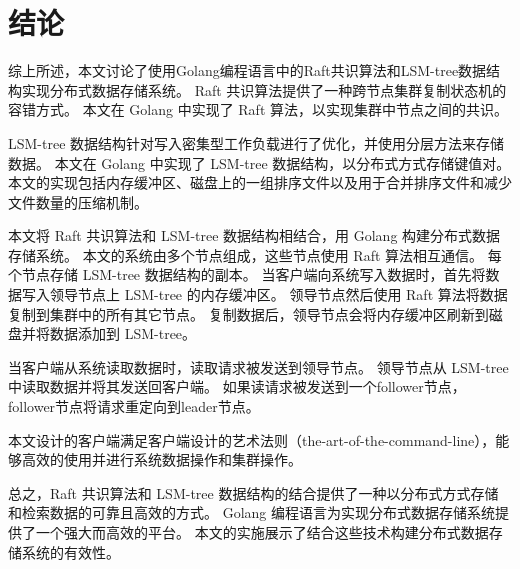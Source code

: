 \section*{结论}

综上所述，本文讨论了使用Golang编程语言中的Raft共识算法和LSM-tree数据结构实现分布式数据存储系统。 Raft 共识算法提供了一种跨节点集群复制状态机的容错方式。 本文在 Golang 中实现了 Raft 算法，以实现集群中节点之间的共识。

	LSM-tree 数据结构针对写入密集型工作负载进行了优化，并使用分层方法来存储数据。 本文在 Golang 中实现了 LSM-tree 数据结构，以分布式方式存储键值对。 本文的实现包括内存缓冲区、磁盘上的一组排序文件以及用于合并排序文件和减少文件数量的压缩机制。
	
	本文将 Raft 共识算法和 LSM-tree 数据结构相结合，用 Golang 构建分布式数据存储系统。 本文的系统由多个节点组成，这些节点使用 Raft 算法相互通信。 每个节点存储 LSM-tree 数据结构的副本。 当客户端向系统写入数据时，首先将数据写入领导节点上 LSM-tree 的内存缓冲区。 领导节点然后使用 Raft 算法将数据复制到集群中的所有其它节点。 复制数据后，领导节点会将内存缓冲区刷新到磁盘并将数据添加到 LSM-tree。
	
	当客户端从系统读取数据时，读取请求被发送到领导节点。 领导节点从 LSM-tree 中读取数据并将其发送回客户端。 如果读请求被发送到一个follower节点，follower节点将请求重定向到leader节点。
	
	本文设计的客户端满足客户端设计的艺术法则（the-art-of-the-command-line），能够高效的使用并进行系统数据操作和集群操作。
	
	总之，Raft 共识算法和 LSM-tree 数据结构的结合提供了一种以分布式方式存储和检索数据的可靠且高效的方式。 Golang 编程语言为实现分布式数据存储系统提供了一个强大而高效的平台。 本文的实施展示了结合这些技术构建分布式数据存储系统的有效性。
	

	
		
	
		 
	
\clearpage